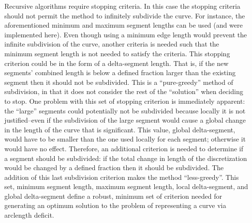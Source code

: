 Recursive algorithms require stopping criteria. In this case the stopping 
criteria should not permit the method to infinitely subdivide the curve. 
For instance, the aforementioned minimum and maximum segment lengths can 
be used (and were implemented here). Even though using a minimum edge 
length would prevent the infinite subdivision of the curve, another 
criteria is needed such that the minimum segment length is not needed to 
satisfy the criteria. This stopping criterion could be in the form of a 
delta-segment length. That is, if the new segments' combined length is 
below a defined fraction larger than the existing segment then it should 
not be subdivided. This is a ``pure-greedy'' method of subdivision, in 
that it does not consider the rest of the ``solution'' when deciding to 
stop. One problem with this set of stopping criterion is immediately 
apparent: the ``large'' segments could potentially not be subdivided 
because locally it is not justified--even if the subdivision of the large 
segment would cause a global change in the length of the curve that is 
significant. This value, global delta-segment, would have to be smaller 
than the one used locally for each segment; otherwise it would have no 
effect. Therefore, an additional criterion is needed to determine if a 
segment should be subdivided: if the total change in length of the 
discretization would be changed by a defined fraction then it should be 
subdivided. The addition of this last subdivision criterion makes the 
method ``less-greedy''. This set, minimum segment length, maximum segment 
length, local delta-segment, and global delta-segment define a robust, 
minimum set of criterion needed for generating an optimum solution to the 
problem of representing a curve via arclength deficit.

